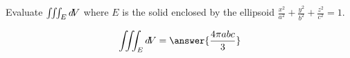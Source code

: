 \documentclass{ximera}
\author{David Guichard \and Neal Koblitz \and H. Jerome Keisler \and Albert Scheller \and Barry Balof \and Mike Wills \and Matthew Carr}
\begin{document}
\begin{exercise}




Evaluate $\iiint_E \mathop{}\!d\! V$ where $E$ is the solid enclosed by the ellipsoid $\frac{x^2}{a^2}+\frac{y^2}{b^2}+\frac{z^2}{c^2}=1$. 

\begin{prompt}
\[
\iiint_E \d V=\answer{\frac{4\pi a b c}{3}}
\]
\end{prompt}



\end{exercise}
\end{document}
